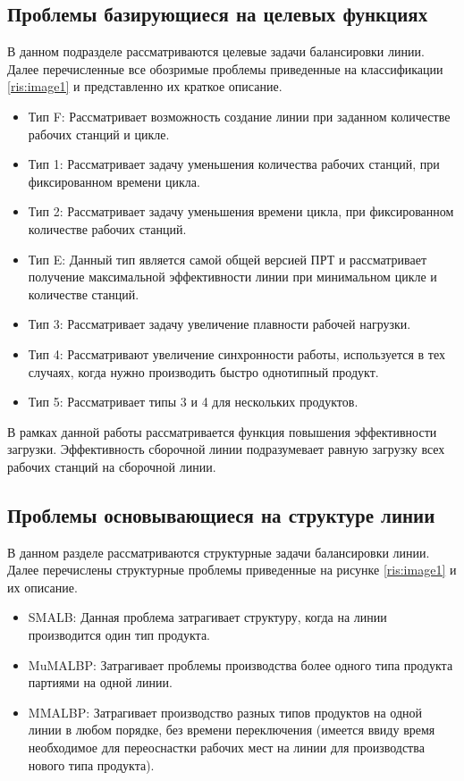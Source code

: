 \subsection{Проблемы базирующиеся на целевых функциях}
В данном подразделе рассматриваются целевые задачи балансировки линии. Далее перечисленные все обозримые проблемы приведенные на классификации \ref{ris:image1} и представленно их краткое описание.
\begin{itemize}
    \item Тип F: Рассматривает возможность создание линии при заданном количестве рабочих станций и цикле.
    \item Тип 1: Рассматривает задачу уменьшения количества рабочих станций, при фиксированном времени цикла.
    \item Тип 2: Рассматривает задачу уменьшения времени цикла, при фиксированном количестве рабочих станций.
    \item Тип E: Данный тип является самой общей версией ПРТ и рассматривает получение максимальной эффективности линии при минимальном цикле и количестве станций.
    \item Тип 3: Рассматривает задачу увеличение плавности рабочей нагрузки.
    \item Тип 4: Рассматривают увеличение синхронности работы, используется в тех случаях, когда нужно производить быстро однотипный продукт.
    \item Тип 5: Рассматривает типы 3 и 4 для нескольких продуктов.
\end{itemize}

В рамках данной работы рассматривается функция повышения эффективности загрузки. Эффективность сборочной линии подразумевает равную загрузку всех рабочих станций на сборочной линии. 

\subsection{Проблемы основывающиеся на структуре линии}
В данном разделе рассматриваются структурные задачи балансировки линии. Далее перечислены структурные проблемы приведенные на рисунке \ref{ris:image1} и их описание.

\begin{itemize}
    \item SMALB: Данная проблема затрагивает структуру, когда на линии производится один тип продукта.
    \item MuMALBP: Затрагивает проблемы производства более одного типа продукта партиями на одной линии.
    \item MMALBP: Затрагивает производство разных типов продуктов на одной линии в любом порядке, без времени переключения (имеется ввиду время необходимое для переоснастки рабочих мест на линии для производства нового типа продукта).
\end{itemize}

